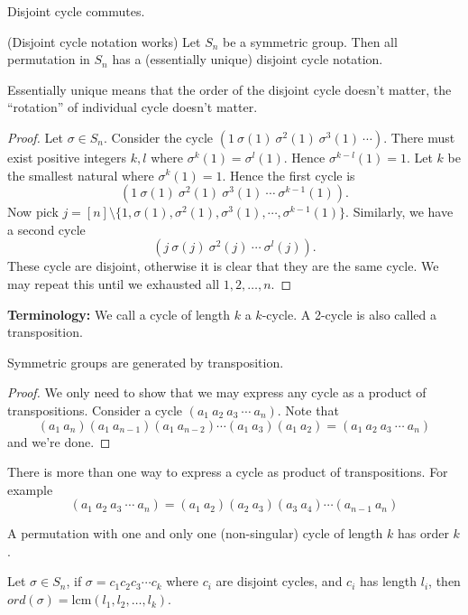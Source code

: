 \documentclass[12pt]{article}
\begin{document}
	\begin{theorem}
	Disjoint cycle commutes.
	\end{theorem}

	\begin{theorem}
	(Disjoint cycle notation works) Let $S_n$ be a symmetric group. Then all permutation in $S_n$ has a (essentially unique) disjoint cycle notation.
	\end{theorem}
	Essentially unique means that the order of the disjoint cycle doesn't matter, the ``rotation'' of individual cycle doesn't matter.
	
	\begin{proof}
	Let $\sigma\in S_n$. Consider the cycle $(1\ \sigma(1)\ \sigma^2(1)\ \sigma^3(1)\ \cdots)$. There must exist positive integers $k,l$ where $\sigma^k(1) = \sigma^l(1)$. Hence $\sigma^{k-l}(1) = 1$. Let $k$ be the smallest natural where $\sigma^k(1)=1$. Hence the first cycle is
	$$(1\ \sigma(1)\ \sigma^2(1)\ \sigma^3(1)\ \cdots\ \sigma^{k-1}(1)).$$
	Now pick $j = [n]\setminus \{1, \sigma(1), \sigma^2(1), \sigma^3(1), \cdots, \sigma^{k-1}(1)\}$. Similarly, we have a second cycle
	$$(j\ \sigma(j)\ \sigma^2(j)\ \cdots\ \sigma^l(j)).$$
	These cycle are disjoint, otherwise it is clear that they are the same cycle. We may repeat this until we exhausted all $1,2,\dots,n$.
	\end{proof}

	\textbf{Terminology:} We call a cycle of length $k$ a $k$-cycle. A 2-cycle is also called a transposition.

	\begin{theorem}
	Symmetric groups are generated by transposition.
	\end{theorem}
	\begin{proof}
	We only need to show that we may express any cycle as a product of transpositions. Consider a cycle $(a_1\ a_2\ a_3\ \cdots\ a_n)$. Note that
	$$(a_1\ a_n)(a_1\ a_{n-1})(a_1\ a_{n-2})\cdots(a_1\ a_3)(a_1\ a_2) = (a_1\ a_2\ a_3\ \cdots\ a_n)$$
	and we're done.
	\end{proof}

	\begin{remark}
	There is more than one way to express a cycle as product of transpositions. For example
	$$(a_1\ a_2\ a_3\ \cdots\ a_n) = (a_1\ a_2)(a_2\ a_3)(a_3\ a_4)\cdots(a_{n-1}\ a_n)$$
	\end{remark}

	\begin{theorem}
	A permutation with one and only one (non-singular) cycle of length $k$ has order $k$.
	\end{theorem}
	\begin{corollary}
	Let $\sigma\in S_n$, if $\sigma = c_1c_2c_3\cdots c_k$ where $c_i$ are disjoint cycles, and $c_i$ has length $l_i$, then $ord(\sigma)=\text{lcm}(l_1,l_2,\dots,l_k)$.
	\end{corollary}
\end{document}
